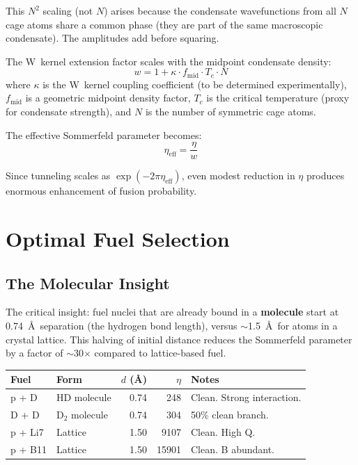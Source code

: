 \documentclass[11pt, a4paper]{article}
\begin{document}
This $N^2$ scaling (not $N$) arises because the condensate
wavefunctions from all $N$ cage atoms share a common phase
(they are part of the same macroscopic condensate). The
amplitudes add before squaring.

The W~kernel extension factor scales with the midpoint
condensate density:
\begin{equation}
  w = 1 + \kappa \cdot f_{\text{mid}} \cdot T_c \cdot N
\end{equation}
where $\kappa$ is the W~kernel coupling coefficient (to be
determined experimentally), $f_{\text{mid}}$ is a geometric
midpoint density factor, $T_c$ is the critical temperature
(proxy for condensate strength), and $N$ is the number of
symmetric cage atoms.

The effective Sommerfeld parameter becomes:
\begin{equation}
  \eta_{\text{eff}} = \frac{\eta}{w}
\end{equation}

Since tunneling scales as $\exp(-2\pi\eta_{\text{eff}})$, even
modest reduction in $\eta$ produces enormous enhancement of
fusion probability.

\section{Optimal Fuel Selection}

\subsection{The Molecular Insight}

The critical insight: fuel nuclei that are already bound in a
\textbf{molecule} start at 0.74~\AA\ separation (the hydrogen
bond length), versus $\sim$1.5~\AA\ for atoms in a crystal
lattice. This halving of initial distance reduces the
Sommerfeld parameter by a factor of $\sim$30$\times$ compared
to lattice-based fuel.

\begin{center}
\begin{tabular}{@{}llrrl@{}}
\toprule
\textbf{Fuel} & \textbf{Form} & \textbf{$d$ (\AA)} &
\textbf{$\eta$} & \textbf{Notes} \\
\midrule
p + D   & HD molecule   & 0.74 & 248  & Clean. Strong interaction. \\
D + D   & D$_2$ molecule & 0.74 & 304  & 50\% clean branch. \\
p + Li7 & Lattice       & 1.50 & 9107 & Clean. High Q. \\
p + B11 & Lattice       & 1.50 & 15901 & Clean. B abundant. \\
\bottomrule
\end{tabular}
\end{center}
\end{document}
